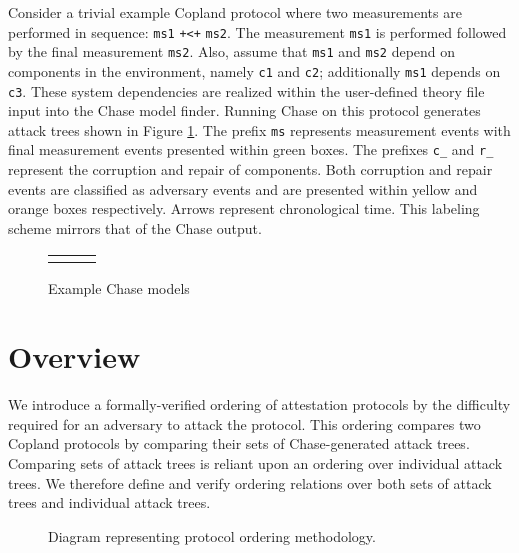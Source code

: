 \documentclass[runningheads]{llncs}
\theoremstyle{definition}
\begin{document}
Consider a trivial example Copland protocol where two measurements are
performed in sequence: \texttt{ms1} \texttt{+<+} \texttt{ms2}.  The
measurement \texttt{ms1} is performed followed by the final
measurement \texttt{ms2}. Also, assume that \texttt{ms1} and
\texttt{ms2} depend on components in the environment, namely
\texttt{c1} and \texttt{c2}; additionally \texttt{ms1} depends on
\texttt{c3}. These system dependencies are realized within the
user-defined theory file input into the Chase model finder. Running
Chase on this protocol generates attack trees shown in Figure
\ref{fig:chase-ex}. The prefix \texttt{ms} represents measurement
events with final measurement events presented within green boxes. The
prefixes \texttt{c\_} and \texttt{r\_} represent the corruption and
repair of components. Both corruption and repair events are classified
as adversary events and are presented within yellow and orange boxes
respectively. Arrows represent chronological time. This
labeling scheme mirrors that of the Chase output.

\begin{figure}[hbtp]
    \centering 
    \begin{tabular}{m{3cm} m{3cm} m{3cm}}
         &  &  
    \end{tabular}
    \caption[Example Chase Models]{Example Chase models}
    \label{fig:chase-ex}
\end{figure}

\section{Overview}
We introduce a formally-verified ordering of attestation protocols by
the difficulty required for an adversary to attack the protocol. This
ordering compares two Copland protocols by comparing their sets of
Chase-generated attack trees. Comparing sets of attack trees is
reliant upon an ordering over individual attack trees.  We therefore
define and verify ordering relations over both sets of attack trees
and individual attack trees.

\begin{figure}[hbtp]
    \centering
    \captionsetup{justification=centering,margin=1cm}
    
    \caption[Protocol ordering abstraction]{Diagram representing protocol ordering methodology. }
    \label{fig:protocol-org-fig}
\end{figure}
\end{document}
